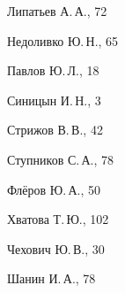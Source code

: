 \begin{theindex}
  \indexspace

  \item Липатьев А.\,А., 72

  \indexspace

  \item Недоливко Ю.\,Н., 65

  \indexspace

  \item Павлов Ю.\,Л., 18

  \indexspace

  \item Синицын И.\,Н., 3
  \item Стрижов В.\,В., 42
  \item Ступников С.\,А., 78

  \indexspace

  \item Флёров Ю.\,А., 50

  \indexspace

  \item Хватова Т.\,Ю., 102

  \indexspace

  \item Чехович Ю.\,В., 30

  \indexspace

  \item Шанин И.\,А., 78

\end{theindex}